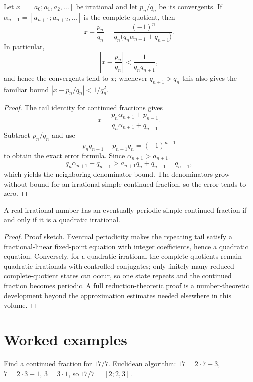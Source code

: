 \begin{theorem}\label{thm:ii25-03}
Let $x=[a_0;a_1,a_2,\ldots]$ be irrational and let $p_n/q_n$ be its convergents. If $\alpha_{n+1}=[a_{n+1};a_{n+2},\ldots]$ is the complete quotient, then
\[
x-\frac{p_n}{q_n}
=\frac{(-1)^n}{q_n\bigl(q_n\alpha_{n+1}+q_{n-1}\bigr)}.
\]
In particular,
\[
\left|x-\frac{p_n}{q_n}\right|
<\frac{1}{q_nq_{n+1}},
\]
and hence the convergents tend to $x$; whenever $q_{n+1}>q_n$ this also gives the familiar bound $|x-p_n/q_n|<1/q_n^2$.
\begin{proof}
The tail identity for continued fractions gives
\[
x=\frac{p_n\alpha_{n+1}+p_{n-1}}{q_n\alpha_{n+1}+q_{n-1}}.
\]
Subtract $p_n/q_n$ and use
\[
p_nq_{n-1}-p_{n-1}q_n=(-1)^{n-1}
\]
to obtain the exact error formula. Since $\alpha_{n+1}>a_{n+1}$,
\[
q_n\alpha_{n+1}+q_{n-1}>a_{n+1}q_n+q_{n-1}=q_{n+1},
\]
which yields the neighboring-denominator bound. The denominators grow without bound for an irrational simple continued fraction, so the error tends to zero.
\end{proof}
\end{theorem}

\begin{theorem}\label{thm:ii25-04}
A real irrational number has an eventually periodic simple continued fraction if and only if it is a quadratic irrational.
\begin{proof}
Proof sketch. Eventual periodicity makes the repeating tail satisfy a fractional-linear fixed-point equation with integer coefficients, hence a quadratic equation. Conversely, for a quadratic irrational the complete quotients remain quadratic irrationals with controlled conjugates; only finitely many reduced complete-quotient states can occur, so one state repeats and the continued fraction becomes periodic. A full reduction-theoretic proof is a number-theoretic development beyond the approximation estimates needed elsewhere in this volume.
\end{proof}
\end{theorem}

\section{Worked examples}

\begin{example}\label{ex:ii25-worked-01}
Find a continued fraction for $17/7$. Euclidean algorithm: $17=2\cdot7+3$, $7=2\cdot3+1$, $3=3\cdot1$, so $17/7=[2;2,3]$.
\end{example}


